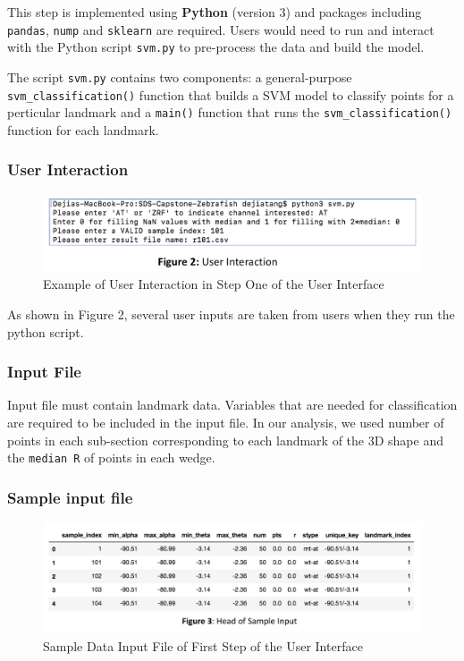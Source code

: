 \documentclass[10pt,letterpaper]{article}
\begin{document}
This step is implemented using \textbf{Python} (version 3) and packages
including \texttt{pandas}, \texttt{nump} and \texttt{sklearn} are
required. Users would need to run and interact with the Python script
\texttt{svm.py} to pre-process the data and build the model.

The script \texttt{svm.py} contains two components: a general-purpose
\texttt{svm\_classification()} function that builds a SVM model to
classify points for a perticular landmark and a \texttt{main()} function
that runs the \texttt{svm\_classification()} function for each landmark.

\subsubsection{User Interaction}\label{user-interaction}

\begin{figure}[h]
\includegraphics[width=4.85in]{figures/Figure2} \caption{Example of User Interaction in Step One of the User Interface}\label{fig:useri}
\end{figure}

As shown in Figure 2, several user inputs are taken from users when they
run the python script.

\subsubsection{Input File}\label{input-file}

Input file must contain landmark data. Variables that are needed for
classification are required to be included in the input file. In our
analysis, we used number of points in each sub-section corresponding to
each landmark of the 3D shape and the \texttt{median\ R} of points in
each wedge.

\subsubsection{Sample input file}\label{sample-input-file}

\begin{figure}[h]
\includegraphics[width=5.11in]{figures/Figure3} \caption{Sample Data Input File of First Step of the User Interface}\label{fig:inputdata}
\end{figure}
\end{document}
